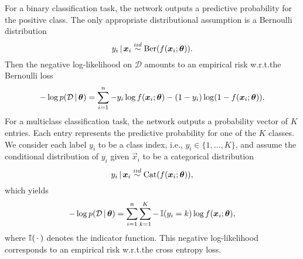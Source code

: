 For a binary classification task, the network outputs a predictive probability for the positive class. The only appropriate distributional assumption is a Bernoulli distribution
\begin{equation*}
  y_i \,|\, \bm{x}_i \overset{iid}{\sim} \operatorname{Ber}(f(\bm{x}_i; \bm{\theta})).
\end{equation*}
Then the negative log-likelihood on $\mathcal{D}$ amounts to an empirical risk w.r.t.\@ the Bernoulli loss
\begin{equation*}
  - \log p(\mathcal{D} \,|\, \bm{\theta})
  = \sum_{i=1}^{n} - y_i \log f(\bm{x}_i; \bm{\theta}) - (1 - y_i) \log (1 - f(\bm{x}_i; \bm{\theta})).
\end{equation*}
For a multiclass classification task, the network outputs a probability vector of $K$ entries. Each entry represents the predictive probability for one of the $K$ classes. We consider each label $y_i$ to be a class index, i.e., $y_i \in \{1, \dots, K\}$, and assume the conditional distribution of $y_i$ given $\vec{x}_i$ to be a categorical distribution
\begin{equation*}
  y_i \,|\, \bm{x}_i \overset{iid}{\sim} \operatorname{Cat}(f(\bm{x}_i; \bm{\theta})),
\end{equation*}
which yields
\begin{equation*}
  - \log p(\mathcal{D} \,|\, \bm{\theta})
  = \sum_{i=1}^{n} \sum_{k=1}^{K} - \operatorname{\mathbb{I}}(y_i = k) \log f(\bm{x}_i; \bm{\theta}),
\end{equation*}
where $\operatorname{\mathbb{I}}(\,\cdot\,)$ denotes the indicator function. This negative log-likelihood corresponds to an empirical risk w.r.t.\@ the cross entropy loss.


